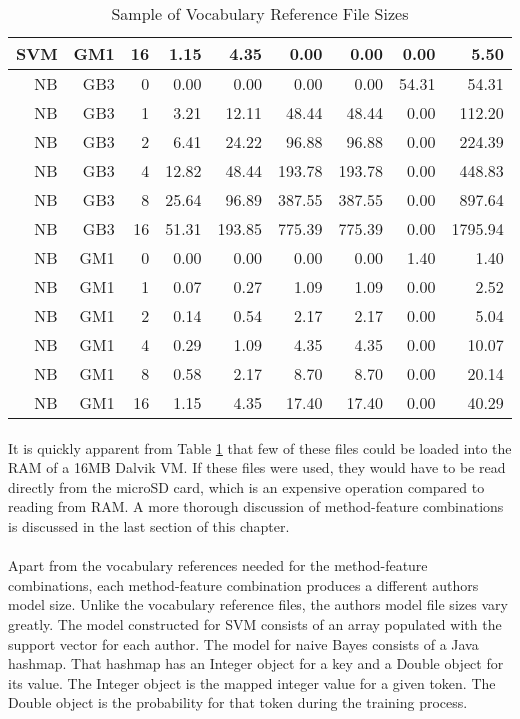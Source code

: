 \begin{table}[htbp!]
\begin{center}
\begin{tabular}{ | r | r | r | r | r | r | r | r | r | }
			SVM & GM1 & 16 & 1.15 & 4.35 & 0.00 & 0.00 & 0.00 & 5.50\\ \hline 
			NB & GB3 & 0 & 0.00 & 0.00 & 0.00 & 0.00 & 54.31 & 54.31\\ \hline 
			NB & GB3 & 1 & 3.21 & 12.11 & 48.44 & 48.44 & 0.00 & 112.20\\ \hline 
			NB & GB3 & 2 & 6.41 & 24.22 & 96.88 & 96.88 & 0.00 & 224.39\\ \hline 
			NB & GB3 & 4 & 12.82 & 48.44 & 193.78 & 193.78 & 0.00 & 448.83\\ \hline 
			NB & GB3 & 8 & 25.64 & 96.89 & 387.55 & 387.55 & 0.00 & 897.64\\ \hline 
			NB & GB3 & 16 & 51.31 & 193.85 & 775.39 & 775.39 & 0.00 & 1795.94\\ \hline 
			NB & GM1 & 0 & 0.00 & 0.00 & 0.00 & 0.00 & 1.40 & 1.40\\ \hline 
			NB & GM1 & 1 & 0.07 & 0.27 & 1.09 & 1.09 & 0.00 & 2.52\\ \hline 
			NB & GM1 & 2 & 0.14 & 0.54 & 2.17 & 2.17 & 0.00 & 5.04\\ \hline 
			NB & GM1 & 4 & 0.29 & 1.09 & 4.35 & 4.35 & 0.00 & 10.07\\ \hline 
			NB & GM1 & 8 & 0.58 & 2.17 & 8.70 & 8.70 & 0.00 & 20.14\\ \hline 
			NB & GM1 & 16 & 1.15 & 4.35 & 17.40 & 17.40 & 0.00 & 40.29\\ \hline
		\end{tabular}
		\caption{Sample of Vocabulary Reference File Sizes}
		\label{tab:sample_vocab_reference_sizes}
		\end{center}
	\end{table}
	

	\paragraph*{} It is quickly apparent from Table \ref{tab:sample_vocab_reference_sizes} that few of these files could be loaded into the RAM of a 16MB Dalvik VM.  If these files were used, they would have to be read directly from the microSD card, which is an expensive operation compared to reading from RAM.  A more thorough discussion of method-feature combinations is discussed in the last section of this chapter.
	
	\paragraph*{} Apart from the vocabulary references needed for the method-feature combinations, each method-feature combination produces a different authors model size.  Unlike the vocabulary reference files, the authors model file sizes vary greatly.  The model constructed for SVM consists of an array populated with the support vector for each author.  The model for naive Bayes consists of a Java hashmap.  That hashmap has an Integer object for a key and a Double object for its value.  The Integer object is the mapped integer value for a given token.  The Double object is the probability for that token during the training process.
	
